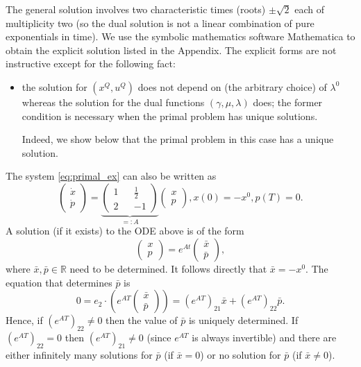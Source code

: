\documentclass[11pt]{article}
\newcommand{\R}{\mathbb R}
\begin{document}
The general solution involves two characteristic times (roots) $\pm \sqrt{2}$ each of multiplicity two (so the dual solution is not a linear combination of pure exponentials in time). We use the symbolic mathematics software {\sf Mathematica} \cite{Mathematica} to obtain the explicit solution listed in the Appendix. The explicit forms are not instructive except for the following fact:
\begin{itemize}
    \item the solution for $\left( x^Q, u^Q \right)$ does not depend on (the arbitrary choice) of $\lambda^0$ whereas the solution for the dual functions $(\gamma, \mu, \lambda)$ does; the former condition is necessary when the primal problem has unique solutions. 

    Indeed, we show below that the primal problem in this case has a unique solution.
\end{itemize}
The system \eqref{eq:primal_ex} can also be written as
\[
\begin{pmatrix} \dot{x}\\\dot{p} \end{pmatrix} = \underbrace{\begin{pmatrix} 1 && \frac12 \\ 2 && -1 \end{pmatrix}}_{=:A} \begin{pmatrix} x \\ p \end{pmatrix}, x(0) = -x^0, p(T) = 0.
\]
A solution (if it exists) to the ODE above is of the form 
\[
\begin{pmatrix}
    x \\ p
\end{pmatrix} = e^{At} \begin{pmatrix}
    \bar{x} \\ \bar{p}
\end{pmatrix},
\]
where $\bar{x}, \bar{p} \in\R$ need to be determined. It follows directly that $\bar{x} = -x^0$. The equation that determines $\bar{p}$ is
\[
0 = e_2 \cdot \left(e^{AT} \begin{pmatrix}
    \bar{x} \\ \bar{p}
\end{pmatrix} \right) = (e^{AT})_{21} \bar{x} + (e^{AT})_{22} \bar{p}.
\]
Hence, if $(e^{AT})_{22} \neq 0$ then the value of $\bar{p}$ is uniquely determined. If $(e^{AT})_{22}=0$ then $(e^{AT})_{21} \neq 0$ (since $e^{AT}$ is always invertible) and there are either infinitely many solutions for $\bar{p}$  (if $\bar{x} = 0$) or no solution for $\bar{p}$ (if $\bar{x}\neq 0$). 
\end{document}
